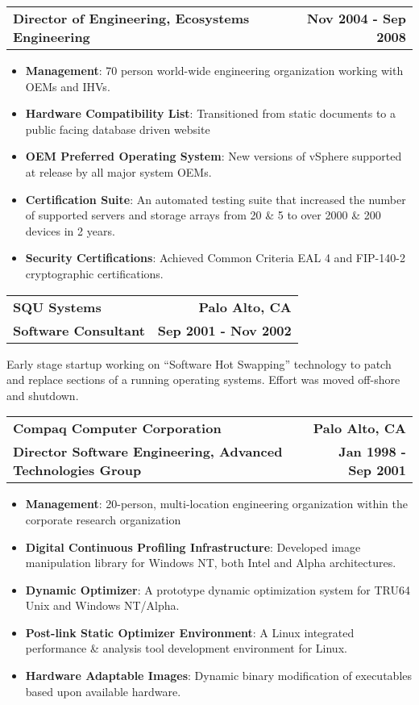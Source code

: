 \documentclass[letterpaper,10pt, sans]{article}
\makeatletter
\newcommand{\resumeCompanyHeading}[4]{
  \vspace{-1pt}
    \item
    \begin{tabular*}{1.0\textwidth}[t]{l@{\extracolsep{\fill}}r}
      \textbf{#1} & \textbf{#2} \\
      \textbf{#3} & \textbf{#4}
    \end{tabular*}\vspace{-1pt}
  }
\newcommand{\resumeCompanyPositionHeading}[2]{
    \vspace{-1pt}
      \item
      \begin{tabular*}{1.0\textwidth}{l@{\extracolsep{\fill}}r}
        \textbf{#1} & \textbf{#2}
    \end{tabular*}\vspace{-1pt}
}
\newcommand{\resumeJobDescription}[1][]{
    \vspace{-1pt}\par{#1}
}
\newcommand{\resumeItem}[2]{\item{{\textbf{#1}}: {#2 \vspace{1pt}}}}
\newcommand{\resumeItemListStart}{\begin{itemize}}\vspace{-1pt}
\newcommand{\resumeItemListEnd}{\end{itemize}}\vspace{-1pt}
\makeatother
\begin{document}
          \resumeCompanyPositionHeading 
          {Director of Engineering, Ecosystems Engineering}
          {Nov 2004 - Sep 2008}
            \resumeItemListStart
                \resumeItem{Management}{70 person world-wide engineering organization working with OEMs and IHVs.}
                \resumeItem{Hardware Compatibility List}{Transitioned from static documents to a public facing database driven website}
                \resumeItem{OEM Preferred Operating System}{New versions of vSphere supported at release by all major system OEMs.}
                \resumeItem{Certification Suite}{An automated testing suite that increased the number of supported servers and storage arrays
                             from 20 \& 5 to over 2000 \& 200 devices in 2 years.}
                \resumeItem{Security Certifications}{Achieved Common Criteria EAL 4 and FIP-140-2 cryptographic certifications.}
            \resumeItemListEnd
  
          \resumeCompanyHeading
            {SQU Systems}{Palo Alto, CA}
            {Software Consultant}{Sep 2001 - Nov 2002}
              \resumeJobDescription{
                Early stage startup working on “Software Hot Swapping” technology to patch and replace sections of a running operating
                systems.  Effort was moved off-shore and shutdown.}

          \resumeCompanyHeading
            {Compaq Computer Corporation}{Palo Alto, CA}
            {Director Software Engineering, Advanced Technologies Group}{Jan 1998 - Sep 2001}
            \resumeItemListStart
                \resumeItem{Management}{20-person, multi-location engineering organization within the corporate research organization}
                \resumeItem{Digital Continuous Profiling Infrastructure}{Developed image manipulation library for Windows NT, both Intel and Alpha architectures.}
                \resumeItem{Dynamic Optimizer}{A prototype dynamic optimization system for TRU64 Unix and Windows NT/Alpha.}
                \resumeItem{Post-link Static Optimizer Environment}{A Linux integrated performance \& analysis tool development environment for Linux.}
                \resumeItem{Hardware Adaptable Images}{Dynamic binary modification of executables based upon available hardware.}
            \resumeItemListEnd
\end{document}
